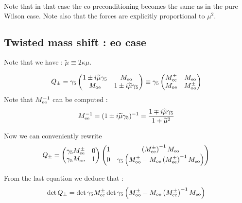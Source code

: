 \documentclass{article}[12pt]
\begin{document}
Note that in that case the eo preconditioning becomes the same as in
the pure Wilson case. Note also that the forces are explicitly
proportional to $\mu^2$.

\subsection{Twisted mass shift : eo case}

Note that we have : $\widetilde{\mu} \equiv 2 \kappa \mu$.

\begin{equation}
Q_{\pm}= \gamma_5 \begin{pmatrix} 
1 \pm i \widetilde{\mu} \gamma_5 & M_{\rm{eo}} \\
M_{\rm{oe}} & 1 \pm i \widetilde{\mu} \gamma_5\\
\end{pmatrix} \equiv \gamma_5 \begin{pmatrix} 
M^{\pm}_{\rm{ee}}  & M_{\rm{eo}} \\
M_{\rm{oe}} & M^{\pm}_{\rm{oo}}\\
\end{pmatrix}
\end{equation}
Note that $M_{\rm{ee}}^{-1}$ can be computed : 
\begin{equation}
M_{\rm{ee}}^{-1} = ( 1 \pm i\widetilde{\mu} \gamma_5)^{-1} = \frac{1\mp
i \widetilde{\mu}\gamma_5 }{ 1 + \widetilde{\mu}^2}
\end{equation}


Now we can conveniently rewrite 
\begin{equation}
Q_{\pm} =  \begin{pmatrix} 
\gamma_5 M^{\pm}_{\rm{ee}}  & 0 \\ \gamma_5 M_{\rm{oe}} & 1\\
\end{pmatrix} \begin{pmatrix} 
1  &  \left(M^{\pm}_{\rm{ee}}\right)^{-1} M_{\rm{eo}} \\0 & \gamma_5
  \left(M^{\pm}_{\rm{oo}} - M_{\rm{oe}}
    \left(M^{\pm}_{\rm{ee}}\right)^{-1} M_{\rm{eo}} \right)\\
\end{pmatrix} 
\end{equation}


From the last equation we deduce that :
\begin{equation}
\det{Q_{\pm}} = \det{\gamma_5 M^{\pm}_{\rm{ee}} } \det{\gamma_5
  \left(M^{\pm}_{\rm{oo}} - M_{\rm{oe}}
    \left(M^{\pm}_{\rm{ee}}\right)^{-1} M_{\rm{eo}} \right)}
\end{equation}
\end{document}

